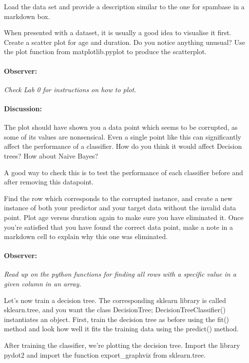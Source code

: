\documentclass{article}
\begin{document}
Load the data set and provide a description similar to the one for spambase in a markdown box. 

When presented with a dataset, it is usually a good idea to visualise it first. Create a scatter plot  for age and duration. Do you notice anything unusual? Use the plot function from matplotlib.pyplot to produce the scatterplot. 

\paragraph{Observer:} \emph{Check Lab 0 for instructions on how to plot.}

\paragraph{Discussion:} The plot should have shown you a data point which seems to be corrupted, as some of its values are nonsensical. Even a single point like this can significantly affect the performance of a classifier. How do you think it would affect Decision trees? How about Naive Bayes? 

A good way to check this is to test the performance of each classifier before and after removing this datapoint.

Find the row which corresponds to the corrupted instance, and create a new instance of both your predictor and your target data without the invalid data point. Plot age versus duration again to make sure you have eliminated it. Once you're satisfied that you have found the correct data point, make a note in a markdown cell to explain why this one was eliminated.

\paragraph{Observer:} \emph{Read up on the python functions for finding all rows with a specific value in a given column in an array.}

Let's now train a decision tree. The corresponding sklearn library is called sklearn.tree, and you want the class DecisionTree; DecisionTreeClassifier() instantiates an object. First, train the decision tree as before using the fit() method and look how well it fits the training data using the predict() method. 

After training the classifier, we're plotting the decision tree. Import the library pydot2 and import the function export\_graphviz from sklearn.tree. 
\end{document}
